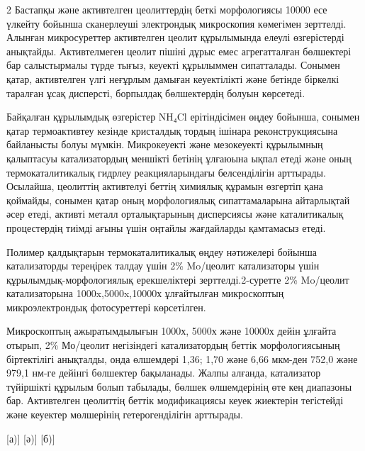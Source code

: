 \begin{multicols}{2}
Бастапқы және активтелген цеолиттердің беткі морфологиясы 10000 есе
үлкейту бойынша сканерлеуші электрондық микроскопия көмегімен зерттелді.
Алынған микросуреттер активтелген цеолит құрылымында елеулі өзгерістерді
анықтайды. Активтелмеген цеолит пішіні дұрыс емес агрегатталған
бөлшектері бар салыстырмалы түрде тығыз, кеуекті құрылыммен сипатталады.
Сонымен қатар, активтелген үлгі неғұрлым дамыған кеуектілікті және
бетінде біркелкі таралған ұсақ дисперсті, борпылдақ бөлшектердің болуын
көрсетеді.

Байқалған құрылымдық өзгерістер NH₄Cl ерітіндісімен өңдеу бойынша,
сонымен қатар термоактивтеу кезінде кристалдық тордың ішінара
реконструкциясына байланысты болуы мүмкін. Микрокеуекті және мезокеуекті
құрылымның қалыптасуы катализатордың меншікті бетінің ұлғаюына ықпал
етеді және оның термокаталитикалық гидрлеу реакцияларындағы
белсенділігін арттырады. Осылайша, цеолиттің активтелуі беттің химиялық
құрамын өзгертіп қана қоймайды, сонымен қатар оның морфологиялық
сипаттамаларына айтарлықтай әсер етеді, активті металл орталықтарының
дисперсиясы және каталитикалық процестердің тиімді ағыны үшін оңтайлы
жағдайларды қамтамасыз етеді.

Полимер қалдықтарын термокаталитикалық өңдеу нәтижелері бойынша
катализаторды тереңірек талдау үшін 2\% Mo/цеолит катализаторы үшін
құрылымдық-морфологиялық ерекшеліктері зерттелді.2-суретте 2\%
Mo/цеолит катализаторына 1000x,5000x,10000х ұлғайтылған микроскоптың
микроэлектрондық фотосуреттері көрсетілген.

Микроскоптың ажыратымдылығын 1000х, 5000х және 10000х дейін ұлғайта
отырып, 2\% Мо/цеолит негізіндегі катализатордың беттік морфологиясының
біртектілігі анықталды, онда өлшемдері 1,36; 1,70 және 6,66 мкм-ден
752,0 және 979,1 нм-ге дейінгі бөлшектер бақыланады. Жалпы алғанда,
катализатор түйіршікті құрылым болып табылады, бөлшек өлшемдерінің өте
кең диапазоны бар. Активтелген цеолиттің беттік модификациясы кеуек
жиектерін тегістейді және кеуектер мөлшерінің гетерогенділігін
арттырады.
\end{multicols}

\begin{figs}
  [а)]
  [ә)]
  [б)]
\end{figs}

